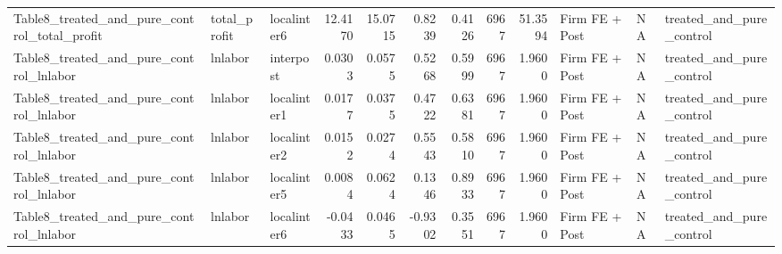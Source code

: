 \begin{table}
\begin{tabular}[t]{lllrrrrrrlll}
Table8\_treated\_and\_pure\_control\_total\_profit & total\_profit & localinter6 & 12.4170 & 15.0715 & 0.8239 & 0.4126 & 6967 & 51.3594 & Firm FE + Post & NA & treated\_and\_pure\_control\\
\addlinespace
Table8\_treated\_and\_pure\_control\_lnlabor & lnlabor & interpost & 0.0303 & 0.0575 & 0.5268 & 0.5999 & 6967 & 1.9600 & Firm FE + Post & NA & treated\_and\_pure\_control\\
Table8\_treated\_and\_pure\_control\_lnlabor & lnlabor & localinter1 & 0.0177 & 0.0375 & 0.4722 & 0.6381 & 6967 & 1.9600 & Firm FE + Post & NA & treated\_and\_pure\_control\\
Table8\_treated\_and\_pure\_control\_lnlabor & lnlabor & localinter2 & 0.0152 & 0.0274 & 0.5543 & 0.5810 & 6967 & 1.9600 & Firm FE + Post & NA & treated\_and\_pure\_control\\
Table8\_treated\_and\_pure\_control\_lnlabor & lnlabor & localinter5 & 0.0084 & 0.0624 & 0.1346 & 0.8933 & 6967 & 1.9600 & Firm FE + Post & NA & treated\_and\_pure\_control\\
Table8\_treated\_and\_pure\_control\_lnlabor & lnlabor & localinter6 & -0.0433 & 0.0465 & -0.9302 & 0.3551 & 6967 & 1.9600 & Firm FE + Post & NA & treated\_and\_pure\_control\\
\bottomrule
\end{tabular}
\end{table}
